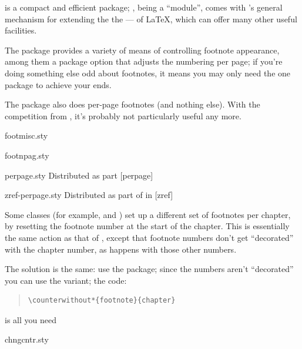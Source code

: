  is a compact and efficient package;
, being a  ``module'', comes with
's general mechanism for extending the the
--- of \LaTeX{}, which can offer many other
useful facilities.

The  package provides a variety of means of
controlling footnote appearance, among them a package option
 that adjusts the numbering per page; if you're
doing something else odd about footnotes, it means you may only need
the one package to achieve your ends.

The  package also does per-page footnotes (and
nothing else).  With the competition from , it's
probably not particularly useful any more.
\begin{ctanrefs}
\item[footmisc.sty]
\item[footnpag.sty]
\item[perpage.sty]Distributed as part [perpage]
\item[zref-perpage.sty]Distributed as part of  in
  [zref]
\end{ctanrefs}


Some classes (for example,  and ) set up a
different set of footnotes per chapter, by resetting the footnote
number at the start of the chapter.  This is essentially the same
action as that of %
,
except that footnote numbers don't get ``decorated'' with the chapter
number, as happens with those other numbers.

The solution is the same: use the  package; since the
numbers aren't ``decorated'' you can use the 
variant; the code:
\begin{quote}
\begin{verbatim}
\counterwithout*{footnote}{chapter}
\end{verbatim}
\end{quote}
is all you need
\begin{ctanrefs}
\item[chngcntr.sty]
\end{ctanrefs}

